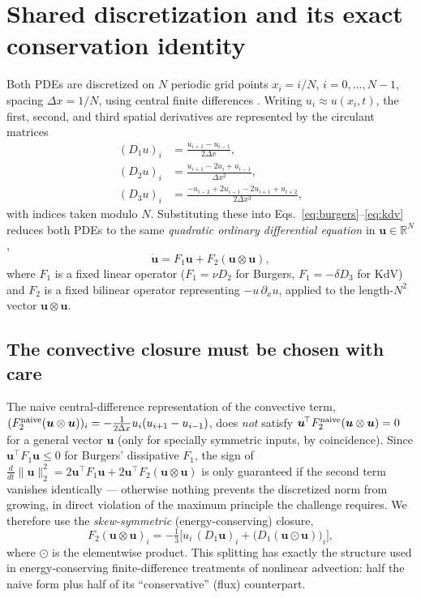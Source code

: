 \documentclass[aps,pra,twocolumn,notitlepage,superscriptaddress,floatfix,10pt]{revtex4-2}
\newcommand{\norm}[1]{\lVert #1 \rVert}
\newcommand{\R}{\mathbb{R}}
\begin{document}
\section{Shared discretization and its exact conservation identity}
\label{sec:discretization}

Both PDEs are discretized on $N$ periodic grid points $x_i=i/N$, $i=0,\dots,N-1$, spacing
$\Delta x=1/N$, using central finite differences \cite{Fornberg1988}. Writing $u_i\approx u(x_i,t)$,
the first, second, and third spatial derivatives are represented by the circulant matrices
\begin{align}
(D_1u)_i&=\frac{u_{i+1}-u_{i-1}}{2\Delta x}, \\
(D_2u)_i&=\frac{u_{i+1}-2u_i+u_{i-1}}{\Delta x^2},\\
(D_3u)_i&=\frac{-u_{i-2}+2u_{i-1}-2u_{i+1}+u_{i+2}}{2\Delta x^3},
\end{align}
with indices taken modulo $N$. Substituting these into Eqs.~\eqref{eq:burgers}--\eqref{eq:kdv} reduces
both PDEs to the same \emph{quadratic ordinary differential equation} in $\bm u\in\R^N$,
\begin{equation}
\dot{\bm u} = F_1\bm u + F_2(\bm u\otimes\bm u),
\label{eq:quadratic-ode}
\end{equation}
where $F_1$ is a fixed linear operator ($F_1=\nu D_2$ for Burgers, $F_1=-\delta D_3$ for KdV) and
$F_2$ is a fixed bilinear operator representing $-u\,\partial_x u$, applied to the length-$N^2$ vector
$\bm u\otimes\bm u$.

\subsection{The convective closure must be chosen with care}
\label{sec:closure}

The naive central-difference representation of the convective term,
$(F_2^{\rm naive}(\bm u\otimes\bm u))_i=-\tfrac{1}{2\Delta x}u_i(u_{i+1}-u_{i-1})$, does \emph{not}
satisfy $\bm u^{\!\top} F_2^{\rm naive}(\bm u\otimes\bm u)=0$ for a general vector $\bm u$ (only for
specially symmetric inputs, by coincidence). Since $\bm u^{\!\top}F_1\bm u\le0$ for Burgers'
dissipative $F_1$, the sign of $\frac{d}{dt}\norm{\bm u}_2^2=2\bm u^{\!\top}F_1\bm u
+2\bm u^{\!\top}F_2(\bm u\otimes\bm u)$ is only guaranteed if the second term vanishes identically ---
otherwise nothing prevents the discretized norm from growing, in direct violation of the maximum
principle the challenge requires. We therefore use the \emph{skew-symmetric} (energy-conserving)
closure,
\begin{equation}
F_2(\bm u\otimes\bm u)_i = -\tfrac{1}{3}\Big[u_i\,(D_1\bm u)_i+\big(D_1(\bm u\!\odot\!\bm u)\big)_i\Big],
\label{eq:f2skew}
\end{equation}
where $\odot$ is the elementwise product. This splitting has exactly the structure used in
energy-conserving finite-difference treatments of nonlinear advection: half the naive form plus half
of its ``conservative'' (flux) counterpart.
\end{document}
